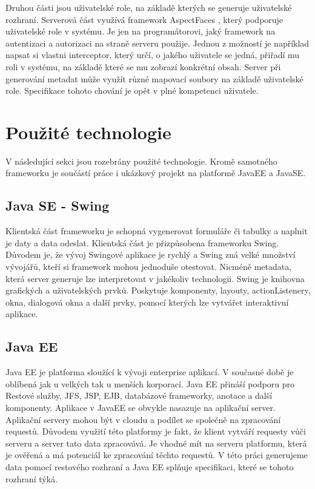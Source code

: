 Druhou části jsou uživatelské role, na základě kterých se generuje uživatelské rozhraní. Serverová část využívá framework AspectFaces \cite{aspectFaces}, který podporuje uživatelské role v systému. Je jen na programátorovi, jaký framework na autentizaci a autorizaci na straně serveru použije. Jednou z možností je například napsat si vlastni interceptor, který určí, o jakého uživatele se jedná, přiřadí mu roli v systému, na základě které se mu zobrazí konkrétní obsah. Server při generování metadat může využít různé mapovací soubory na základě uživatelské role. Specifikace tohoto chování je opět v plné kompetenci uživatele.
\section{Použité technologie}
V následující sekci jsou rozebrány použité technologie. Kromě samotného frameworku je součástí práce i ukázkový projekt na platformě JavaEE a JavaSE.
\subsection{Java SE - Swing}
Klientská část frameworku je schopná vygenerovat formuláře či tabulky a naplnit je daty a data odeslat. Klientská část je přizpůsobena frameworku Swing. Důvodem je, že vývoj Swingové aplikace je rychlý a Swing zná velké množství vývojářů, kteří si framework mohou jednoduše otestovat. Nicméně metadata, která server generuje lze interpretovat v jakékoliv technologii. Swing je knihovna grafických a uživatelských prvků. Poskytuje komponenty, layouty, actionListenery, okna, dialogová okna a další prvky, pomocí kterých lze vytvářet interaktivní aplikace.
\subsection{Java EE}
Java EE je platforma sloužící k vývoji enterprise aplikací. V současné době je oblíbená jak u velkých tak u menších korporací. Java EE přináší podporu pro Restové služby, JFS, JSP, EJB, databázové frameworky, anotace a další komponenty. Aplikace v JavaEE se obvykle nasazuje na aplikační server. Aplikační servery mohou být v cloudu a podílet se společně na zpracování requestů. Důvodem využití této platformy je fakt, že klient vytváří requesty vůči serveru a server tato data zpracovává. Je vhodné mít na serveru platformu, která je ověřená a má potenciál ke zpracování těchto requestů. V této práci generujeme data pomocí restového rozhraní a Java EE splňuje specifikaci, které se tohoto rozhraní týká. 
